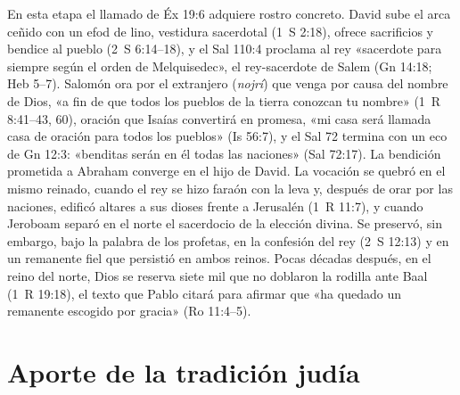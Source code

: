 \documentclass[11pt,letterpaper]{article}
\begin{document}
En esta etapa el llamado de Éx 19:6 adquiere rostro concreto. David sube el arca ceñido con un efod de lino, vestidura sacerdotal (1~S 2:18), ofrece sacrificios y bendice al pueblo (2~S 6:14--18), y el Sal 110:4 proclama al rey «sacerdote para siempre según el orden de Melquisedec», el rey-sacerdote de Salem (Gn 14:18; Heb 5--7). Salomón ora por el extranjero (\emph{nojrí}) que venga por causa del nombre de Dios, «a fin de que todos los pueblos de la tierra conozcan tu nombre» (1~R 8:41--43, 60), oración que Isaías convertirá en promesa, «mi casa será llamada casa de oración para todos los pueblos» (Is 56:7), y el Sal 72 termina con un eco de Gn 12:3: «benditas serán en él todas las naciones» (Sal 72:17). La bendición prometida a Abraham converge en el hijo de David. La vocación se quebró en el mismo reinado, cuando el rey se hizo faraón con la leva y, después de orar por las naciones, edificó altares a sus dioses frente a Jerusalén (1~R 11:7), y cuando Jeroboam separó en el norte el sacerdocio de la elección divina. Se preservó, sin embargo, bajo la palabra de los profetas, en la confesión del rey (2~S 12:13) y en un remanente fiel que persistió en ambos reinos. Pocas décadas después, en el reino del norte, Dios se reserva siete mil que no doblaron la rodilla ante Baal (1~R 19:18), el texto que Pablo citará para afirmar que «ha quedado un remanente escogido por gracia» (Ro 11:4--5).

\section{Aporte de la tradición judía}
\end{document}
